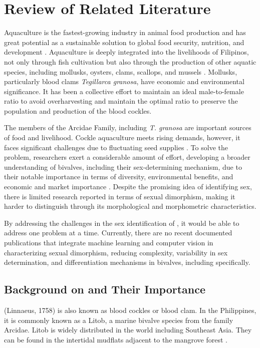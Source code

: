 \chapter{Review of Related Literature}
\label{sec:relatedlit}

Aquaculture is the fastest-growing industry in animal food production and has great potential as a sustainable solution to global food security, nutrition, and development \cite{fao2024}. Aquaculture is deeply integrated into the livelihoods of Filipinos, not only through fish cultivation but also through the production of other aquatic species, including mollusks, oysters, clams, scallops, and mussels \cite{breton2017sex}. Mollusks, particularly blood clams \textit{Tegillarca granosa}, have economic and environmental significance. It has been a collective effort to maintain an ideal male-to-female ratio to avoid overharvesting and maintain the optimal ratio to preserve the population and production of the blood cockles. 
	
The members of the Arcidae Family, including \textit{T. granosa} are important sources of food and livelihood. Cockle aquaculture meets rising demands, however, it faces significant challenges due to fluctuating seed supplies \cite{miranda2023}. To solve the problem, researchers exert a considerable amount of effort, developing a broader understanding of bivalves, including their sex-determining mechanism, due to their notable importance in terms of diversity, environmental benefits, and economic and market importance \cite{breton2017sex}. Despite the promising idea of identifying sex, there is limited research reported in terms of sexual dimorphism, making it harder to distinguish through its morphological and morphometric characteristics. 

By addressing the challenges in the sex identification of \Tgranosa, it would be able to address one problem at a time. Currently, there are no recent documented publications that integrate machine learning and computer vision in characterizing sexual dimorphism, reducing complexity, variability in sex determination, and differentiation mechanisms in bivalves, including \Tgranosa specifically.

\section{Background on \textit{\Tegillarcagranosa} and Their Importance}
\textit{\Tegillarcagranosa}(Linnaeus, 1758) is also known as blood cockles or blood clam. In the Philippines, it is commonly known as a Litob, a marine bivalve species from the family Arcidae. Litob is widely distributed in the world including Southeast Asia. They can be found in the intertidal mudflats adjacent to the mangrove forest \cite{srisunont2020}.

